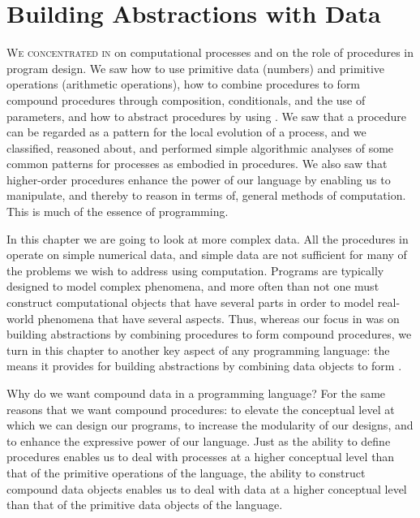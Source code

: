 \chapter{Building Abstractions with Data}
\label{Chapter 2}


\vspace{2em}

\lettrine[findent=1pt]{W}{e concentrated in}  on computational processes and on the role of procedures in program design.
We saw how to use primitive data (numbers) and primitive operations (arithmetic operations), how to combine procedures to form compound procedures through composition, conditionals, and the use of parameters, and how to abstract procedures by using .
We saw that a procedure can be regarded as a pattern for the local evolution of a process, and we classified, reasoned about, and performed simple algorithmic analyses of some common patterns for processes as embodied in procedures.
We also saw that higher-order procedures enhance the power of our language by enabling us to manipulate, and thereby to reason in terms of, general methods of computation.
This is much of the essence of programming.

In this chapter we are going to look at more complex data.
All the procedures in  operate on simple numerical data, and simple data are not sufficient for many of the problems we wish to address using computation.
Programs are typically designed to model complex phenomena, and more often than not one must construct computational objects that have several parts in order to model real-world phenomena that have several aspects.
Thus, whereas our focus in  was on building abstractions by combining procedures to form compound procedures, we turn in this chapter to another key aspect of any programming language:
the means it provides for building abstractions by combining data objects to form .

Why do we want compound data in a programming language?
For the same reasons that we want compound procedures:
to elevate the conceptual level at which we can design our programs, to increase the modularity of our designs, and to enhance the expressive power of our language.
Just as the ability to define procedures enables us to deal with processes at a higher conceptual level than that of the primitive operations of the language, the ability to construct compound data objects enables us to deal with data at a higher conceptual level than that of the primitive data objects of the language.

